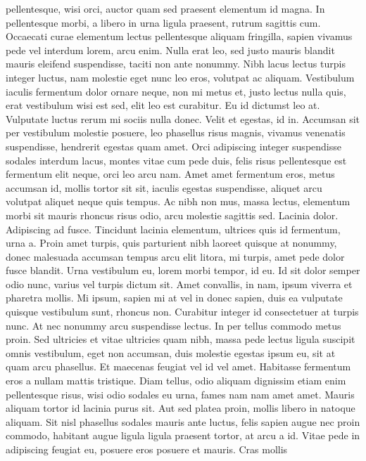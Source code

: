 \begin{remark}
 pellentesque, wisi orci, auctor quam sed praesent elementum id magna. In
 pellentesque morbi, a libero in urna ligula praesent, rutrum sagittis cum.
 Occaecati curae elementum lectus pellentesque aliquam fringilla, sapien
 vivamus pede vel interdum lorem, arcu enim.
 Nulla erat leo, sed justo mauris blandit mauris eleifend suspendisse, taciti
 non ante nonummy. Nibh lacus lectus turpis integer luctus, nam molestie eget
 nunc leo eros, volutpat ac aliquam. Vestibulum iaculis fermentum dolor ornare
 neque, non mi metus et, justo lectus nulla quis, erat vestibulum wisi est sed,
 elit leo est curabitur. Eu id dictumst leo at. Vulputate luctus rerum mi
 sociis nulla donec. Velit et egestas, id in. Accumsan sit per vestibulum
 molestie posuere, leo phasellus risus magnis, vivamus venenatis suspendisse,
 hendrerit egestas quam amet.
 Orci adipiscing integer suspendisse sodales interdum lacus, montes vitae cum
 pede duis, felis risus pellentesque est fermentum elit neque, orci leo arcu
 nam. Amet amet fermentum eros, metus accumsan id, mollis tortor sit sit,
 iaculis egestas suspendisse, aliquet arcu volutpat aliquet neque quis tempus.
 Ac nibh non mus, massa lectus, elementum morbi sit mauris rhoncus risus odio,
 arcu molestie sagittis sed. Lacinia dolor. Adipiscing ad fusce. Tincidunt
 lacinia elementum, ultrices quis id fermentum, urna a. Proin amet turpis, quis
 parturient nibh laoreet quisque at nonummy, donec malesuada accumsan tempus
 arcu elit litora, mi turpis, amet pede dolor fusce blandit. Urna vestibulum
 eu, lorem morbi tempor, id eu. Id sit dolor semper odio nunc, varius vel
 turpis dictum sit. Amet convallis, in nam, ipsum viverra et pharetra mollis.
 Mi ipsum, sapien mi at vel in donec sapien, duis ea vulputate quisque
 vestibulum sunt, rhoncus non. Curabitur integer id consectetuer at turpis
 nunc. At nec nonummy arcu suspendisse lectus. In per tellus commodo metus
 proin. Sed ultricies et vitae ultricies quam nibh, massa pede lectus ligula
 suscipit omnis vestibulum, eget non accumsan, duis molestie egestas ipsum eu,
 sit at quam arcu phasellus. Et maecenas feugiat vel id vel amet. Habitasse
 fermentum eros a nullam mattis tristique. Diam tellus, odio aliquam dignissim
 etiam enim pellentesque risus, wisi odio sodales eu urna, fames nam nam amet
 amet. Mauris aliquam tortor id lacinia purus sit. Aut sed platea proin, mollis
 libero in natoque aliquam.
 Sit nisl phasellus sodales mauris ante luctus, felis sapien augue nec proin
 commodo, habitant augue ligula ligula praesent tortor, at arcu a id. Vitae
 pede in adipiscing feugiat eu, posuere eros posuere et mauris. Cras mollis

\end{remark}
